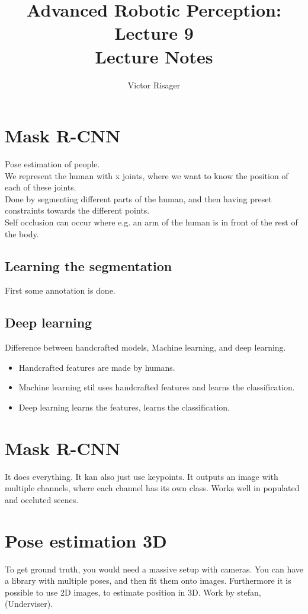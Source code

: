 \documentclass[a4paper]{article}
\title{Advanced Robotic Perception: Lecture 9 \\
	\large Lecture Notes}
\author{Victor Risager}
\begin{document}
\maketitle

\section{Mask R-CNN}
Pose estimation of people. \\
We represent the human with x joints, where we want to know the position of each of these joints. \\
Done by segmenting different parts of the human, and then having preset constraints towards the different points. \\
Self occlusion can occur where e.g. an arm of the human is in front of the rest of the body. 

\subsection{Learning the segmentation}
First some annotation is done.

\subsection{Deep learning}
Difference between handcrafted models, Machine learning, and deep learning.

\begin{itemize}  
	\item Handcrafted features are made by humans.
	\item Machine learning stil uses handcrafted features and learns the classification. 
	\item Deep learning learns the features, learns the classification.
\end{itemize}


\section{Mask R-CNN}
It does everything. It kan also just use keypoints. 
It outputs an image with multiple channels, where each channel has its own class. 
Works well in populated and occluted scenes. 


\section{Pose estimation 3D}
To get ground truth, you would need a massive setup with cameras. 
You can have a library with multiple poses, and then fit them onto images. 
Furthermore it is possible to use 2D images, to estimate position in 3D. Work by stefan, (Underviser). 
\end{document}
